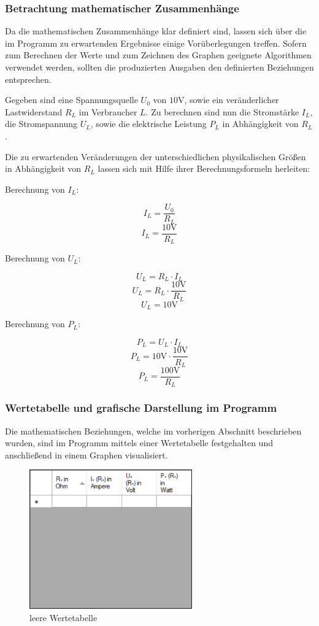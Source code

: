 \documentclass[a4paper]{article}
\begin{document}
    \subsubsection{Betrachtung mathematischer Zusammenhänge}

    Da die mathematischen Zusammenhänge klar definiert sind, lassen sich über die im Programm zu erwartenden Ergebnisse einige Vorüberlegungen treffen.
    Sofern zum Berechnen der Werte und zum Zeichnen des Graphen geeignete Algorithmen verwendet werden, sollten die produzierten Ausgaben den definierten Beziehungen entsprechen.

    Gegeben sind eine Spannungsquelle $U_0$ von $10 \si{\volt}$, sowie ein veränderlicher Lastwiderstand $R_L$ im Verbraucher $L$.
    Zu berechnen sind nun die Stromstärke $I_L$, die Stromspannung $U_L$, sowie die elektrische Leistung $P_L$ in Abhängigkeit von $R_L$.

    Die zu erwartenden Veränderungen der unterschiedlichen physikalischen Größen in Abhängigkeit von $R_L$ lassen sich mit Hilfe ihrer Berechnungsformeln herleiten:

    Berechnung von $I_L$:

    \[ I_L = \frac{U_0}{R_L} \]
    \[ I_L = \frac{10\si{\volt}}{R_L} \]

    Berechnung von $U_L$:

    \[ U_L = R_L \cdot I_L \]
    \[ U_L = R_L \cdot \frac{10\si{\volt}}{R_L} \]
    \[ U_L = 10\si{\volt} \]

    Berechnung von $P_L$:

    \[ P_L = U_L \cdot I_L \]
    \[ P_L = 10\si{\volt} \cdot \frac{10\si{\volt}}{R_L} \]
    \[ P_L = \frac{100\si{\volt}}{R_L} \]

    \subsubsection{Wertetabelle und grafische Darstellung im Programm}
    
    Die mathematischen Beziehungen, welche im vorherigen Abschnitt beschrieben wurden, sind im Programm mittels einer Wertetabelle festgehalten und anschließend in einem Graphen visualisiert.
    \begin{figure}[!h]
        \begin{center}
            \includegraphics[width=7cm]{img/tabelle}
            \caption{leere Wertetabelle}
            \label{fig:tabelle}
        \end{center}
    \end{figure}
\end{document}
